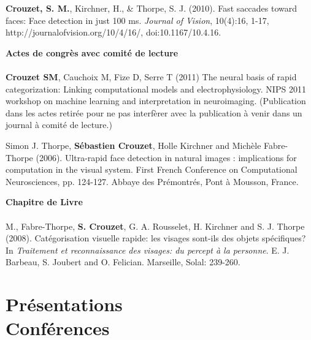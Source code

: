 \documentclass[margin,line]{resume}
\begin{document}
\begin{resume}
	\vspace{-2mm} \textbf{Crouzet, S. M.}, Kirchner, H., \& Thorpe, S. J.  (2010). Fast saccades toward faces: Face detection in just 100 ms. \textit{Journal of Vision}, 10(4):16, 1-17, http://journalofvision.org/10/4/16/, doi:10.1167/10.4.16.


%
%	

\vspace{3mm}	
\textbf{Actes de congrès avec comité de lecture}\\\\
  \textbf{Crouzet SM}, Cauchoix M, Fize D, Serre T (2011) The neural basis of rapid categorization: Linking computational models and electrophysiology. NIPS 2011 workshop on machine learning and interpretation in neuroimaging. (Publication dans les actes retirée pour ne pas interfèrer avec la publication à venir dans un journal à comité de lecture.)

	\vspace{-2mm} Simon J. Thorpe, \textbf{Sébastien Crouzet}, Holle Kirchner and Michèle Fabre-Thorpe (2006). Ultra-rapid face detection in natural images : implications for computation in the visual system. First French Conference on Computational Neurosciences, pp. 124-127. Abbaye des Prémontrés, Pont à Mousson, France.


\vspace{3mm}	
\textbf{Chapitre de Livre}\\\\
	M., Fabre-Thorpe, \textbf{S. Crouzet}, G. A. Rousselet, H. Kirchner and S. J. Thorpe (2008). Catégorisation visuelle rapide: les visages sont-ils des 	objets spécifiques? In \textsl{Traitement et reconnaissance des visages: du percept à la personne}. E. J. Barbeau, S. Joubert and O. Felician. Marseille, Solal: 239-260.


\vspace{3mm}	
    \section{\mysidestyle Présentations\\Conférences}


\end{resume}
\end{document}
